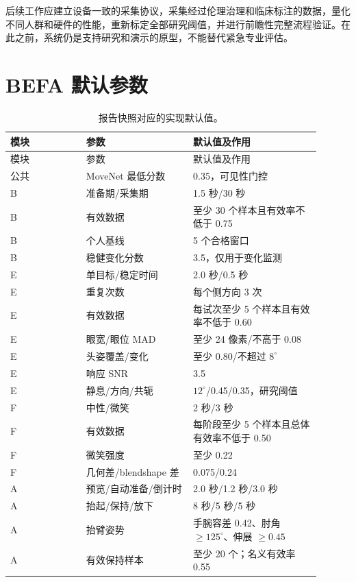 \documentclass[11pt,a4paper]{article}
\begin{document}
后续工作应建立设备一致的采集协议，采集经过伦理治理和临床标注的数据，量化不同人群和硬件的性能，重新标定全部研究阈值，并进行前瞻性完整流程验证。在此之前，系统仍是支持研究和演示的原型，不能替代紧急专业评估。




\appendix
\section{BEFA 默认参数}

\begin{longtable}{p{0.22\linewidth}p{0.31\linewidth}p{0.37\linewidth}}
\caption{报告快照对应的实现默认值。}\\
\toprule
模块 & 参数 & 默认值及作用 \\
\midrule
\endfirsthead
\toprule
模块 & 参数 & 默认值及作用 \\
\midrule
\endhead
公共 & MoveNet 最低分数 & 0.35，可见性门控 \\
B & 准备期/采集期 & 1.5 秒/30 秒 \\
B & 有效数据 & 至少 30 个样本且有效率不低于 0.75 \\
B & 个人基线 & 5 个合格窗口 \\
B & 稳健变化分数 & 3.5，仅用于变化监测 \\
E & 单目标/稳定时间 & 2.0 秒/0.5 秒 \\
E & 重复次数 & 每个侧方向 3 次 \\
E & 有效数据 & 每试次至少 5 个样本且有效率不低于 0.60 \\
E & 眼宽/眼位 MAD & 至少 24 像素/不高于 0.08 \\
E & 头姿覆盖/变化 & 至少 0.80/不超过 $8^{\circ}$ \\
E & 响应 SNR & 3.5 \\
E & 静息/方向/共轭 & $12^{\circ}$/0.45/0.35，研究阈值 \\
F & 中性/微笑 & 2 秒/3 秒 \\
F & 有效数据 & 每阶段至少 5 个样本且总体有效率不低于 0.50 \\
F & 微笑强度 & 至少 0.22 \\
F & 几何差/blendshape 差 & 0.075/0.24 \\
A & 预览/自动准备/倒计时 & 2.0 秒/1.2 秒/3.0 秒 \\
A & 抬起/保持/放下 & 8 秒/5 秒/5 秒 \\
A & 抬臂姿势 & 手腕容差 0.42、肘角 $\geq125^{\circ}$、伸展 $\geq0.45$ \\
A & 有效保持样本 & 至少 20 个；名义有效率 0.55 \\

\end{longtable}
\end{document}
